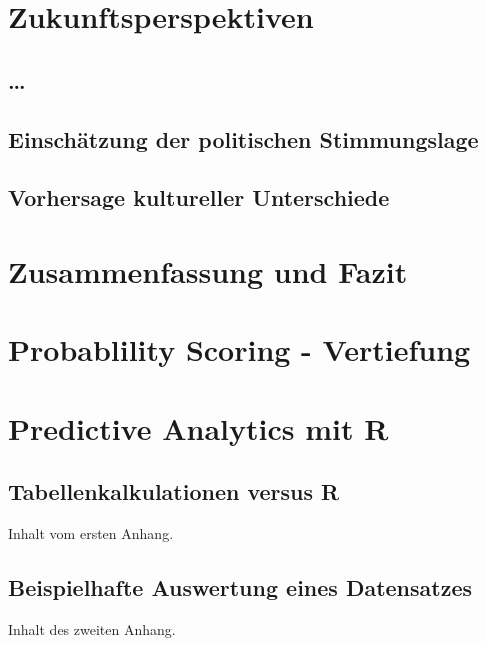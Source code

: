 \documentclass[12pt,a4paper,listof=totoc,oneside]{scrreprt}
\begin{document}

\chapter{Zukunftsperspektiven}

\section{\ldots}

\section{Einschätzung der politischen Stimmungslage}

\section{Vorhersage kultureller Unterschiede}

\chapter{Zusammenfassung und Fazit}

\appendix
\chapter{Probablility Scoring - Vertiefung}

\chapter{Predictive Analytics mit R}

\section{Tabellenkalkulationen versus R}

Inhalt vom ersten Anhang.

\section{Beispielhafte Auswertung eines Datensatzes}

Inhalt des zweiten Anhang.

{}


\listoffigures
\listoftables
\printglossary[title=Glossar]
\printglossary[type=\acronymtype, title=Akronyme]
\end{document}
